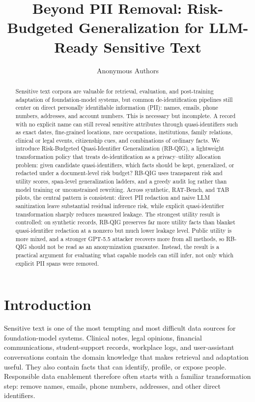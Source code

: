 \documentclass{article}
\title{Beyond PII Removal: Risk-Budgeted Generalization for LLM-Ready Sensitive Text}
\author{Anonymous Authors}
\begin{document}
\ifcolmsubmission
\linenumbers
\fi

\maketitle

\begin{abstract}
Sensitive text corpora are valuable for retrieval, evaluation, and
post-training adaptation of foundation-model systems, but common
de-identification pipelines still center on direct personally identifiable
information (PII): names, emails, phone numbers, addresses, and account
numbers. This is necessary but incomplete. A record with no explicit name can
still reveal sensitive attributes through quasi-identifiers such as exact
dates, fine-grained locations, rare occupations, institutions, family
relations, clinical or legal events, citizenship cues, and combinations of
ordinary facts. We introduce Risk-Budgeted Quasi-Identifier Generalization
(RB-QIG), a lightweight transformation policy that treats de-identification as
a privacy--utility allocation problem: given candidate quasi-identifiers,
which facts should be kept, generalized, or redacted under a document-level
risk budget? RB-QIG uses transparent risk and utility scores, span-level
generalization ladders, and a greedy audit log rather than model training or
unconstrained rewriting. Across synthetic, RAT-Bench, and TAB pilots, the
central pattern is consistent: direct PII redaction and naive LLM sanitization
leave substantial residual inference risk, while explicit quasi-identifier
transformation sharply reduces measured leakage. The strongest utility result
is controlled: on synthetic records, RB-QIG preserves far more utility facts
than blanket quasi-identifier redaction at a nonzero but much lower leakage
level. Public utility is more mixed, and a stronger GPT-5.5 attacker recovers
more from all methods, so RB-QIG should not be read as an anonymization
guarantee. Instead, the result is a practical argument for evaluating what
capable models can still infer, not only which explicit PII spans were
removed.
\end{abstract}

\section{Introduction}

Sensitive text is one of the most tempting and most difficult data sources for
foundation-model systems. Clinical notes, legal opinions, financial
communications, student-support records, workplace logs, and user-assistant
conversations contain the domain knowledge that makes retrieval and adaptation
useful. They also contain facts that can identify, profile, or expose people.
Responsible data enablement therefore often starts with a familiar
transformation step: remove names, emails, phone numbers, addresses, and other
direct identifiers.
\end{document}
